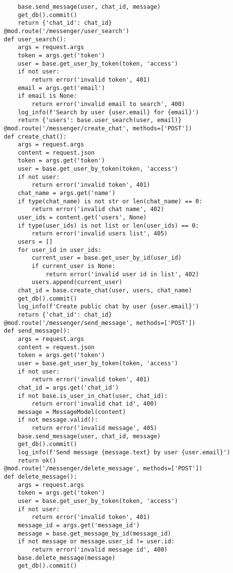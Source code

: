 \documentclass[listing]{espd}
\begin{document}
\begin{verbatim}
    base.send_message(user, chat_id, message)
    get_db().commit()
    return {'chat_id': chat_id}
@mod.route('/messenger/user_search')
def user_search():
    args = request.args
    token = args.get('token')
    user = base.get_user_by_token(token, 'access')
    if not user:
        return error('invalid token', 401)
    email = args.get('email')
    if email is None:
        return error('invalid email to search', 400)
    log_info(f'Search by user {user.email} for {email}')
    return {'users': base.user_search(user, email)}
@mod.route('/messenger/create_chat', methods=['POST'])
def create_chat():
    args = request.args
    content = request.json
    token = args.get('token')
    user = base.get_user_by_token(token, 'access')
    if not user:
        return error('invalid token', 401)
    chat_name = args.get('name')
    if type(chat_name) is not str or len(chat_name) == 0:
        return error('invalid chat name', 402)
    user_ids = content.get('users', None)
    if type(user_ids) is not list or len(user_ids) == 0:
        return error('invalid users list', 405)
    users = []
    for user_id in user_ids:
        current_user = base.get_user_by_id(user_id)
        if current_user is None:
            return error('invalid user id in list', 402)
        users.append(current_user)
    chat_id = base.create_chat(user, users, chat_name)
    get_db().commit()
    log_info(f'Create public chat by user {user.email}')
    return {'chat_id': chat_id}
@mod.route('/messenger/send_message', methods=['POST'])
def send_message():
    args = request.args
    content = request.json
    token = args.get('token')
    user = base.get_user_by_token(token, 'access')
    if not user:
        return error('invalid token', 401)
    chat_id = args.get('chat_id')
    if not base.is_user_in_chat(user, chat_id):
        return error('invalid chat id', 400)
    message = MessageModel(content)
    if not message.valid():
        return error('invalid message', 405)
    base.send_message(user, chat_id, message)
    get_db().commit()
    log_info(f'Send message {message.text} by user {user.email}')
    return ok()
@mod.route('/messenger/delete_message', methods=['POST'])
def delete_message():
    args = request.args
    token = args.get('token')
    user = base.get_user_by_token(token, 'access')
    if not user:
        return error('invalid token', 401)
    message_id = args.get('message_id')
    message = base.get_message_by_id(message_id)
    if not message or message.user_id != user.id:
        return error('invalid message id', 400)
    base.delete_message(message)
    get_db().commit()

\end{verbatim}
\end{document}

